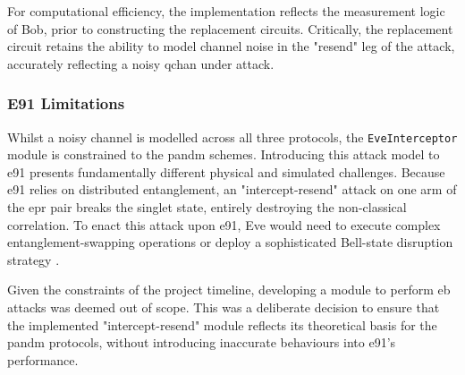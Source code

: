 \begin{algorithm}[H]
    \caption{Intercept-Resend Eavesdropper Logic}\label{alg:eve_intercept}
\end{algorithm}

For computational efficiency, the implementation reflects the measurement logic of Bob, prior to constructing the replacement circuits. Critically, the replacement circuit retains the ability to model channel noise in the "resend" leg of the attack, accurately reflecting a noisy \gls{qchan} under attack.

\subsubsection*{E91 Limitations}
Whilst a noisy channel is modelled across all three protocols, the \texttt{EveInterceptor} module is constrained to the \gls{pandm} schemes. Introducing this attack model to \gls{e91} presents fundamentally different physical and simulated challenges. Because \gls{e91} relies on distributed entanglement, an "intercept-resend" attack on one arm of the \gls{epr} pair breaks the singlet state, entirely destroying the non-classical correlation. To enact this attack upon \gls{e91}, Eve would need to execute complex entanglement-swapping operations or deploy a sophisticated Bell-state disruption strategy \cite{E91}. 

Given the constraints of the project timeline, developing a module to perform \gls{eb} attacks was deemed out of scope. This was a deliberate decision to ensure that the implemented "intercept-resend" module reflects its theoretical basis for the \gls{pandm} protocols, without introducing inaccurate behaviours into \gls{e91}'s performance.



